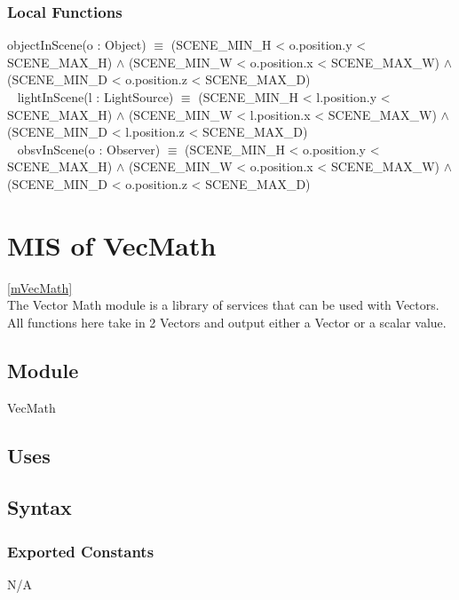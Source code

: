 \documentclass[12pt, titlepage]{article}
\begin{document}
\subsubsection{Local Functions}
objectInScene(o : Object) $\equiv$ (SCENE\_MIN\_H < o.position.y < 
SCENE\_MAX\_H) 
$\land$ (SCENE\_MIN\_W < o.position.x < SCENE\_MAX\_W) $\land$ 
(SCENE\_MIN\_D < o.position.z < SCENE\_MAX\_D) \\
~\newline
lightInScene(l : LightSource) $\equiv$ (SCENE\_MIN\_H < l.position.y < 
SCENE\_MAX\_H) 
$\land$ (SCENE\_MIN\_W < l.position.x < SCENE\_MAX\_W) $\land$ 
(SCENE\_MIN\_D < l.position.z < SCENE\_MAX\_D)\\
~\newline
obsvInScene(o : Observer) $\equiv$ (SCENE\_MIN\_H < o.position.y < 
SCENE\_MAX\_H) 
$\land$ (SCENE\_MIN\_W < o.position.x < SCENE\_MAX\_W) $\land$ 
(SCENE\_MIN\_D < o.position.z < SCENE\_MAX\_D) \\


\newpage

\section{MIS of VecMath} \ref{mVecMath} \\
The Vector Math module is a library of services that can be used with Vectors. 
All functions here take in 2 Vectors and output either a Vector or a scalar 
value.

\subsection{Module}
VecMath

\subsection{Uses}

\subsection{Syntax}
\subsubsection{Exported Constants}
N/A
\end{document}
